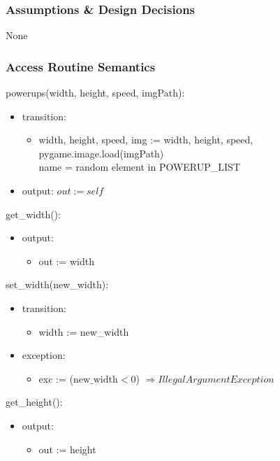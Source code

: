 \documentclass[12pt]{article}
\begin{document}
\subsubsection* {Assumptions \& Design Decisions}

None

\subsubsection* {Access Routine Semantics}

\noindent powerups(width, height, speed, imgPath):
\begin{itemize}
    \item transition: 
    \begin{itemize}[]
        \item width, height, speed, img := width, height, speed, pygame.image.load(imgPath)\\
        name = random element in POWERUP\_LIST
    \end{itemize}
    \item output: $out := self$
\end{itemize}

\noindent get\_width():
\begin{itemize}
    \item output: 
    \begin{itemize}[]
        \item out := width 
    \end{itemize}
\end{itemize}


\noindent set\_width(new\_width):
\begin{itemize}
    \item transition: 
    \begin{itemize}[]
        \item width := new\_width 
    \end{itemize}

    \item exception:
        \begin{itemize}[]
            \item exc := ($\text{new\_width} < 0$) $\Rightarrow  IllegalArgumentException$
        \end{itemize}
\end{itemize}

\noindent get\_height():
\begin{itemize}
    \item output: 
    \begin{itemize}[]
        \item out := height
    \end{itemize}
\end{itemize}
\end{document}
